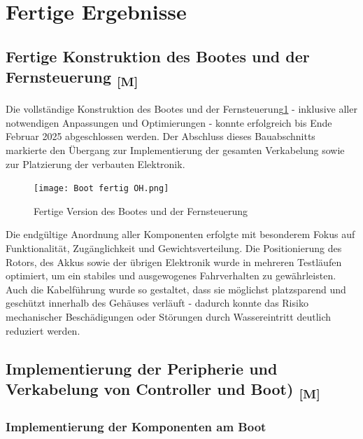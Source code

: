\documentclass[a4paper,12pt]{article}
\begin{document}
\section{Fertige Ergebnisse}

\subsection{\texorpdfstring{Fertige Konstruktion des Bootes und der Fernsteuerung \textsubscript{[M]}}{Fertige Konstruktion des Bootes und der Fernsteuerung [M]}}

Die vollständige Konstruktion des Bootes und der Fernsteuerung\ref{fig:Fertige Version des Bootes und der Fernsteuerung} - inklusive aller notwendigen Anpassungen und Optimierungen - konnte erfolgreich bis Ende Februar 2025 abgeschlossen werden. Der Abschluss dieses Bauabschnitts markierte den Übergang zur Implementierung der gesamten Verkabelung sowie zur Platzierung der verbauten Elektronik.

\begin{figure}[H]
    \centering
    \texttt{[image: Boot fertig OH.png]}
    \caption{Fertige Version des Bootes und der Fernsteuerung}
    \label{fig:Fertige Version des Bootes und der Fernsteuerung}
\end{figure}

Die endgültige Anordnung aller Komponenten erfolgte mit besonderem Fokus auf Funktionalität, Zugänglichkeit und Gewichtsverteilung. Die Positionierung des Rotors, des Akkus sowie der übrigen Elektronik wurde in mehreren Testläufen optimiert, um ein stabiles und ausgewogenes Fahrverhalten zu gewährleisten. Auch die Kabelführung wurde so gestaltet, dass sie möglichst platzsparend und geschützt innerhalb des Gehäuses verläuft - dadurch konnte das Risiko mechanischer Beschädigungen oder Störungen durch Wassereintritt deutlich reduziert werden.

\newpage

\subsection{\texorpdfstring{Implementierung der Peripherie und Verkabelung von Controller und Boot) \textsubscript{[M]}}{Implementierung der Peripherie und Verkabelung von Controller und Boot) [M]}}

\subsubsection{Implementierung der Komponenten am Boot}
\end{document}
